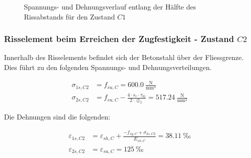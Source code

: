 \documentclass[
  11pt,
  letterpaper,
]{scrreprt}
\begin{document}
\begin{figure}[H]

\begin{minipage}{0.50\linewidth}



\end{minipage}%
%
\begin{minipage}{0.50\linewidth}



\end{minipage}%

\caption{\label{fig-jag_zustand_c1}Spannungs- und Dehnungsverlauf
entlang der Hälfte des Rissabstands für den Zustand \(C1\)}

\end{figure}%

\subsubsection{\texorpdfstring{Risselement beim Erreichen der
Zugfestigkeit - Zustand
\(C2\)}{Risselement beim Erreichen der Zugfestigkeit - Zustand C2}}\label{risselement-beim-erreichen-der-zugfestigkeit---zustand-c2}

Innerhalb des Risselements befindet sich der Betonstahl über der
Fliessgrenze. Dies führt zu den folgenden Spannungs- und
Dehnungsverteilungen.

\[
\begin{aligned}
\sigma_{1 s , C2}& = f_{su , C} = 600.0 \ \frac{\mathrm{N}}{\mathrm{mm}^{2}} \\ 
\sigma_{2 s , C2}& = f_{su , C} - \frac{4 \cdot s_{r} \cdot \tau_{b1}}{2 \cdot \oslash_{x}} = 517.24 \ \frac{\mathrm{N}}{\mathrm{mm}^{2}} \end{aligned}
\]

Die Dehnungen sind die folgenden:

\[
\begin{aligned}
\varepsilon_{1 s , C2}& = \varepsilon_{sh , C} + \frac{- f_{sy , C} + \sigma_{2 s , C2}}{E_{sh , C}} = 38.11 \ \mathrm{‰} \\ 
\varepsilon_{2 s , C2}& = \varepsilon_{su , C} = 125 \ \mathrm{‰} \end{aligned}
\]
\end{document}
